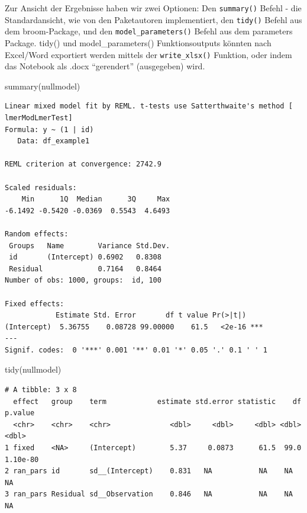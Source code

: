 \documentclass[
  letterpaper,
  DIV=11,
  numbers=noendperiod]{scrreprt}
\newenvironment{Shaded}{\begin{snugshade}}{\end{snugshade}}
\newcommand{\FunctionTok}[1]{\textcolor[rgb]{0.28,0.35,0.67}{#1}}
\newcommand{\NormalTok}[1]{\textcolor[rgb]{0.00,0.23,0.31}{#1}}
\begin{document}
Zur Ansicht der Ergebnisse haben wir zwei Optionen: Den
\texttt{summary()} Befehl - die Standardansicht, wie von den
Paketautoren implementiert, den \texttt{tidy()} Befehl aus dem
broom-Package, und den \texttt{model\_parameters()} Befehl aus dem
parameters Package. tidy() und model\_parameters() Funktionsoutputs
könnten nach Excel/Word exportiert werden mittels der
\texttt{write\_xlsx()} Funktion, oder indem das Notebook als .docx
``gerendert'' (ausgegeben) wird.

\begin{Shaded}
\begin{Highlighting}[]
\FunctionTok{summary}\NormalTok{(nullmodel)}
\end{Highlighting}
\end{Shaded}

\begin{verbatim}
Linear mixed model fit by REML. t-tests use Satterthwaite's method [
lmerModLmerTest]
Formula: y ~ (1 | id)
   Data: df_example1

REML criterion at convergence: 2742.9

Scaled residuals: 
    Min      1Q  Median      3Q     Max 
-6.1492 -0.5420 -0.0369  0.5543  4.6493 

Random effects:
 Groups   Name        Variance Std.Dev.
 id       (Intercept) 0.6902   0.8308  
 Residual             0.7164   0.8464  
Number of obs: 1000, groups:  id, 100

Fixed effects:
            Estimate Std. Error       df t value Pr(>|t|)    
(Intercept)  5.36755    0.08728 99.00000    61.5   <2e-16 ***
---
Signif. codes:  0 '***' 0.001 '**' 0.01 '*' 0.05 '.' 0.1 ' ' 1
\end{verbatim}

\begin{Shaded}
\begin{Highlighting}[]
\FunctionTok{tidy}\NormalTok{(nullmodel)}
\end{Highlighting}
\end{Shaded}

\begin{verbatim}
# A tibble: 3 x 8
  effect   group    term            estimate std.error statistic    df   p.value
  <chr>    <chr>    <chr>              <dbl>     <dbl>     <dbl> <dbl>     <dbl>
1 fixed    <NA>     (Intercept)        5.37     0.0873      61.5  99.0  1.10e-80
2 ran_pars id       sd__(Intercept)    0.831   NA           NA    NA   NA       
3 ran_pars Residual sd__Observation    0.846   NA           NA    NA   NA       
\end{verbatim}
\end{document}
